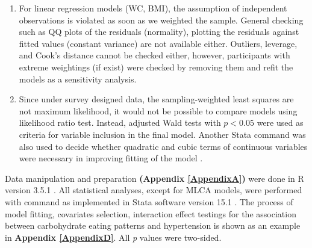 \begin{enumerate}
	\item For linear regression models (WC, BMI), the assumption of independent observations is violated as soon as we weighted the sample. General checking such as QQ plots of the residuals (normality), plotting the residuals against fitted values (constant variance) are not available either. Outliers, leverage, and Cook's distance cannot be checked either, however, participants with extreme weightings (if exist) were checked by removing them and refit the models as a sensitivity analysis.
	\item Since under survey designed data, the sampling-weighted least squares are not maximum likelihood, it would not be possible to compare models using likelihood ratio test. Instead, adjusted Wald tests with $p < 0.05$ were used as criteria for variable inclusion in the final model. Another Stata command  was also used to  decide whether quadratic and cubic terms of continuous variables were necessary in improving fitting of the model \parencite{pregibon1980goodness}. 
\end{enumerate}

Data manipulation and preparation \textbf{(Appendix \ref{AppendixA})} were done in R version 3.5.1 \parencite{R3.5.1}. All statistical analyses, except for MLCA models, were performed with  command as implemented in Stata software version 15.1 \parencite{stata15}. The process of model fitting, covariates selection, interaction effect testings for the association between carbohydrate eating patterns and hypertension is shown as an example in \textbf{Appendix \ref{AppendixD}}. All \textit{p} values were two-sided.
